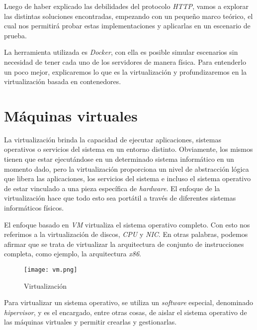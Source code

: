 
Luego de haber explicado las debilidades del protocolo \emph{HTTP}, vamos a explorar las 
distintas soluciones encontradas, empezando con un pequeño marco teórico, el cual 
nos permitirá probar estas implementaciones y aplicarlas en un escenario de prueba.

La herramienta utilizada es \emph{Docker}, con ella es posible simular 
escenarios sin necesidad de tener cada uno de los servidores de manera física. Para
entenderlo un poco mejor, explicaremos lo que es la virtualización y profundizaremos 
en la virtualización basada en contenedores.
    
\section{Máquinas virtuales}

La virtualización brinda la capacidad de ejecutar aplicaciones, sistemas 
operativos o servicios del sistema en un entorno distinto. 
Obviamente, los mismos tienen que estar ejecutándose en un determinado 
sistema informático en un momento dado, pero la virtualización proporciona 
un nivel de abstracción lógica que libera las aplicaciones, los servicios 
del sistema e incluso el sistema operativo de estar vinculado a una 
pieza específica de \emph{hardware}. El enfoque de la virtualización hace 
que todo esto sea portátil a través de diferentes sistemas informáticos 
físicos.

El enfoque basado en \emph{VM} virtualiza el sistema operativo completo. Con esto nos referimos 
a la virtualización de discos, \emph{CPU} y \emph{NIC}. En otras palabras, podemos afirmar que se 
trata de virtualizar la arquitectura de conjunto de instrucciones completa, como ejemplo, 
la arquitectura \emph{x86}. 

\begin{center}
    \begin{figure}   
       \begin{center}
          \texttt{[image: vm.png]}
       \end{center}
       \caption{Virtualización}
    \end{figure}
 \end{center}

Para virtualizar un sistema operativo, se utiliza un \emph{software} especial, denominado
\emph{hipervisor}, y es el encargado, entre otras cosas, de aislar el sistema 
operativo de las máquinas virtuales y 
permitir crearlas y gestionarlas.


